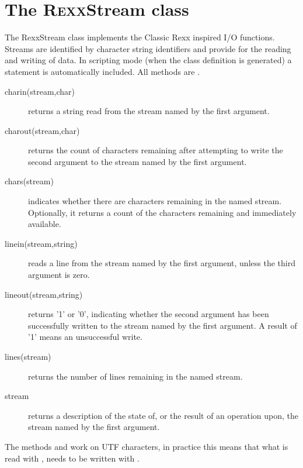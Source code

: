 \section{The R\textsc{exx}Stream class}\label{refrexxstream}

The RexxStream class implements the Classic Rexx inspired I/O
functions. Streams are identified by character string identifiers and
provide for the reading and writing of data. In scripting mode (when
the class definition is generated) a  statement is
automatically included. All methods are .

\begin{description}
  
\item[charin(stream,char)] returns a string read from the stream named by the first
argument.

\item[charout(stream,char)] returns the count of characters remaining after attempting to
write the second argument to the stream named by the first argument.

\item[chars(stream)] indicates whether there are characters remaining in the named
stream. Optionally, it returns a count of the characters remaining and
immediately available.

\item[linein(stream,string)] reads a line from the stream named by the first argument,
unless the third argument is zero.

\item[lineout(stream,string)] returns '1' or '0', indicating whether the second argument has been successfully written to the stream named by the first argument. A result of '1' means an unsuccessful write.

\item[lines(stream)] returns the number of lines remaining in the named stream.

\item[stream] returns a description of the state of, or the result of an
operation upon, the stream named by the first argument.

\end{description}

The methods  and  work on UTF
characters, in practice this means that what is read with
, needs to be written with .


